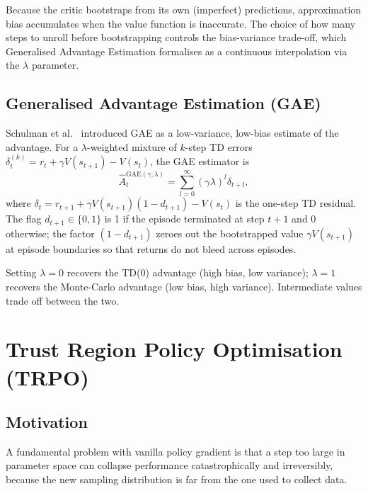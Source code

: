 \documentclass[12pt, a4paper]{article}
\theoremstyle{definition}
\theoremstyle{plain}
\theoremstyle{remark}
\begin{document}
Because the critic bootstraps from its own (imperfect) predictions, approximation
bias accumulates when the value function is inaccurate.  The choice of how many
steps to unroll before bootstrapping controls the bias-variance trade-off, which
Generalised Advantage Estimation formalises as a continuous interpolation via the
$\lambda$ parameter.

\subsection{Generalised Advantage Estimation (GAE)}
\label{sec:gae}

Schulman et al.\ \cite{schulman2016gae} introduced GAE as a low-variance, low-bias estimate of the
advantage.  For a $\lambda$-weighted mixture of $k$-step TD errors
$\delta_t^{(k)} = r_t + \gamma V(s_{t+1}) - V(s_t)$,
the GAE estimator is
\begin{equation}
  \hat{A}_t^{\mathrm{GAE}(\gamma, \lambda)}
    = \sum_{l=0}^{\infty} (\gamma\lambda)^l \delta_{t+l},
  \label{eq:gae}
\end{equation}
where $\delta_t = r_{t+1} + \gamma V(s_{t+1})(1 - d_{t+1}) - V(s_t)$ is the
one-step TD residual.  The flag $d_{t+1} \in \{0, 1\}$ is 1 if the episode
terminated at step $t{+}1$ and 0 otherwise; the factor $(1 - d_{t+1})$ zeroes
out the bootstrapped value $\gamma V(s_{t+1})$ at episode boundaries so that
returns do not bleed across episodes.

Setting $\lambda = 0$ recovers the TD(0) advantage (high bias, low variance);
$\lambda = 1$ recovers the Monte-Carlo advantage (low bias, high variance).
Intermediate values trade off between the two.

\section{Trust Region Policy Optimisation (TRPO)}
\label{sec:trpo}

\subsection{Motivation}

A fundamental problem with vanilla policy gradient is that a step too large in parameter
space can collapse performance catastrophically and irreversibly, because the new
sampling distribution is far from the one used to collect data.
\end{document}
